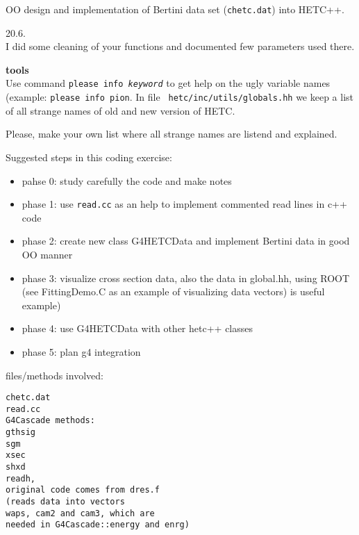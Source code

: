 OO design and implementation of Bertini data set ({\tt chetc.dat})
into HETC++.


20.6.\\
I did some cleaning of your functions and documented few parameters
used there.


{\bf tools} \\
Use command {\tt please info {\it keyword}} to get help on the ugly
variable names (example: {\tt please info pion}.  In file {\tt
  hetc/inc/utils/globals.hh} we keep a list of all strange names of
old and new version of HETC.

Please, make your own list where all strange names are listend and
explained.

Suggested steps in this coding exercise:
\begin{itemize}
\item pahse 0: study carefully the code and make notes
\item phase 1: use {\tt read.cc} as an help to implement commented
  read lines in c++ code
\item phase 2: create new class G4HETCData and implement Bertini data
  in good OO manner
\item phase 3: visualize cross section data, also the data in
  global.hh, using ROOT (see FittingDemo.C as an example of
  visualizing data vectors) is useful example)
\item phase 4: use G4HETCData with other hetc++ classes
\item phase 5: plan g4 integration
\end{itemize}

files/methods involved: \scriptsize
\begin{verbatim}
chetc.dat
read.cc
G4Cascade methods:
gthsig 
sgm
xsec
shxd
readh,
original code comes from dres.f 
(reads data into vectors 
waps, cam2 and cam3, which are 
needed in G4Cascade::energy and enrg)
\end{verbatim}
\normalsize

